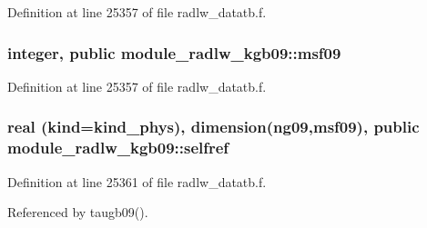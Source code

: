 Definition at line 25357 of file radlw\+\_\+datatb.\+f.

\subsubsection[{\texorpdfstring{msf09}{msf09}}]{\setlength{\rightskip}{0pt plus 5cm}integer, public module\+\_\+radlw\+\_\+kgb09\+::msf09}\hypertarget{namespacemodule__radlw__kgb09_a7d728ef04b3f26c6b20149084334be5a}{}\label{namespacemodule__radlw__kgb09_a7d728ef04b3f26c6b20149084334be5a}


Definition at line 25357 of file radlw\+\_\+datatb.\+f.

\subsubsection[{\texorpdfstring{selfref}{selfref}}]{\setlength{\rightskip}{0pt plus 5cm}real (kind=kind\+\_\+phys), dimension(ng09,{\bf msf09}), public module\+\_\+radlw\+\_\+kgb09\+::selfref}\hypertarget{namespacemodule__radlw__kgb09_a1c65e91a215060738292d0ca5a8f38a2}{}\label{namespacemodule__radlw__kgb09_a1c65e91a215060738292d0ca5a8f38a2}


Definition at line 25361 of file radlw\+\_\+datatb.\+f.



Referenced by taugb09().

